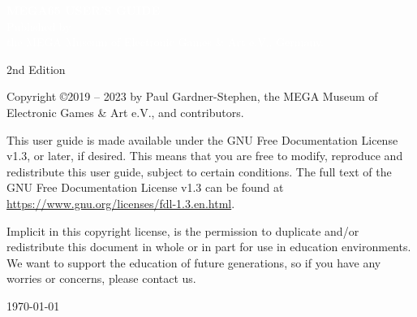 \def\printmanual{true}







\cleardoublepage


 \begin{titlepage}
 \pagecolor{blue}
 \begin{center}
 {
    \large
    \vspace*{2cm}
    {\Huge\textcolor{white}{\bf{MEGA65 USER'S GUIDE}}}\\
    \vspace{\fill}
    {\textcolor{white}
    {Published by \\ the MEGA Museum of Electronic Games \& Art e.V., Germany.}}
 }
 \end{center}
 \end{titlepage}

  \pagecolor{white}\textcolor{black}
  \vfill
  2nd Edition

  Copyright \copyright 2019 -- 2023 by Paul Gardner-Stephen,
  the MEGA Museum of Electronic Games \& Art e.V.,
  and contributors.

  This user guide is made available under the GNU Free Documentation
  License v1.3, or later, if desired. This means that you are free to
  modify, reproduce  and redistribute this user guide, subject to
  certain conditions. The full text of the GNU Free Documentation
  License v1.3 can be found at
  \url{https://www.gnu.org/licenses/fdl-1.3.en.html}.

  Implicit in this copyright license, is the permission to duplicate
  and/or redistribute this document in whole or in part for use in
  education environments. We want to support the education of future
  generations, so if you have any worries or concerns, please contact us.

   \par\today

\pagestyle{onlynumber}
\pagecolor{white}

